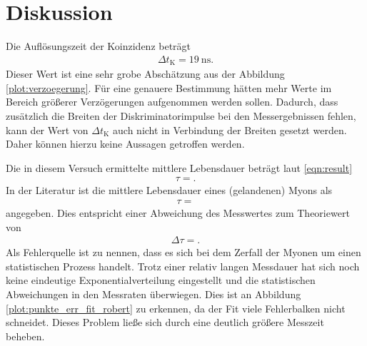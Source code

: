 \section{Diskussion}
\label{sec:Diskussion}

Die Auflösungszeit der Koinzidenz beträgt
\begin{align*}
  \Delta t_\text{K} = \SI{19}{\nano\second}.
\end{align*}
Dieser Wert ist eine sehr grobe Abschätzung aus der Abbildung \ref{plot:verzoegerung}.
Für eine genauere Bestimmung hätten mehr Werte im Bereich größerer Verzögerungen aufgenommen werden sollen.
Dadurch, dass zusätzlich die Breiten der Diskriminatorimpulse bei den Messergebnissen fehlen, kann der Wert von $\Delta t_\text{K}$ auch nicht in Verbindung der Breiten gesetzt werden.
Daher können hierzu keine Aussagen getroffen werden.

Die in diesem Versuch ermittelte mittlere Lebensdauer beträgt laut \eqref{eqn:result}
\begin{align*}
  \tau = .
\end{align*}
In der Literatur \cite{Agashe:2014kda} ist die mittlere Lebensdauer eines (gelandenen) Myons als
\begin{align*}
  \tau = 
\end{align*}
angegeben.
Dies entspricht einer Abweichung des Messwertes zum Theoriewert von
\begin{align*}
  \Delta \tau = .
\end{align*}
Als Fehlerquelle ist zu nennen, dass es sich bei dem Zerfall der Myonen um einen statistischen Prozess handelt.
Trotz einer relativ langen Messdauer hat sich noch keine eindeutige Exponentialverteilung eingestellt und die statistischen Abweichungen in den Messraten überwiegen.
Dies ist an Abbildung \ref{plot:punkte_err_fit_robert} zu erkennen, da der Fit viele Fehlerbalken nicht schneidet.
Dieses Problem ließe sich durch eine deutlich größere Messzeit beheben.\\

